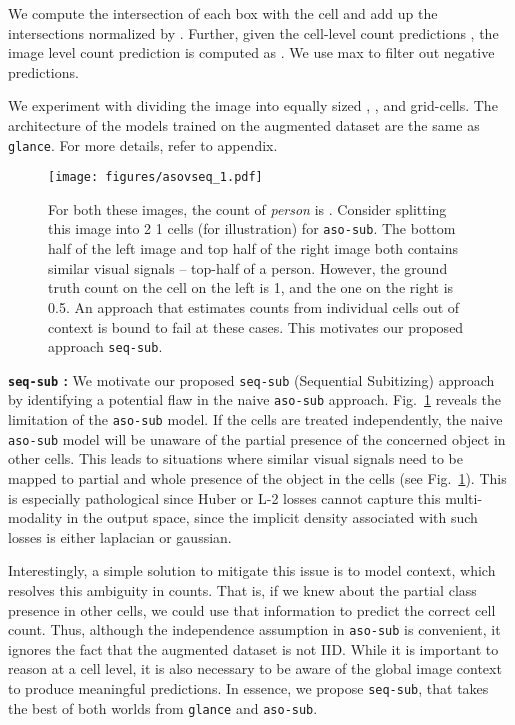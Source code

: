 \documentclass[10pt,twocolumn,letterpaper]{article}
\newcommand{\sub}{\texttt{aso-sub}\xspace}
\newcommand{\seq}{\texttt{seq-sub}\xspace}
\newcommand{\glance}{\texttt{glance}\xspace}
\begin{document}
We compute the intersection of each box  with the cell  and add up the intersections normalized by .
Further, given the cell-level count predictions , the image level count prediction is computed as . We use max to filter out negative predictions. 


We experiment with dividing the image into equally sized , , and  grid-cells. The architecture of the models trained on the augmented dataset are the same as \glance. For more details, refer to appendix.
\begin{figure}[t]
\texttt{[image: figures/asovseq\_1.pdf]}
\vspace{-15pt}
\caption{\footnotesize{For both these images, the count of \emph{person} is . Consider splitting this image into 2  1 cells (for illustration) for \sub. The bottom half of the left image and top half of the right image both contains similar visual signals -- top-half of a person. However, the ground truth count on the cell on the left is 1, and the one on the right is 0.5. An approach that estimates counts from individual cells out of context is bound to fail at these cases. This motivates our proposed approach \seq. 
}}
\label{fig:asoproblem}
\vspace{-17pt}
\end{figure}

\par \noindent
\textbf{\seq{} :} We motivate our proposed \seq{} (Sequential Subitizing) approach by identifying a potential flaw in the naive \sub{} approach. Fig.~\ref{fig:asoproblem} reveals the limitation of the \sub{} model.
If the cells are treated independently, the naive \sub model will be unaware of the partial presence of the concerned object in other cells. This leads to situations where similar visual signals need to be mapped to partial and whole presence of the object in the cells (see Fig.~\ref{fig:asoproblem}). This is especially pathological since Huber or L-2 losses cannot capture this multi-modality in the output space, since the implicit density associated with such losses is either laplacian or gaussian.

Interestingly, a simple solution to mitigate this issue is to model context, which resolves this ambiguity in counts. That is, if we knew about the partial class presence in other cells, we could use that information to predict the correct cell count. Thus, although the independence assumption in \sub is convenient, it ignores the fact that the augmented dataset is not IID. While it is important to reason at a cell level, it is also necessary to be aware of the global image context to produce meaningful predictions. In essence, we propose \seq, that takes the best of both worlds from \glance and \sub.
\end{document}

